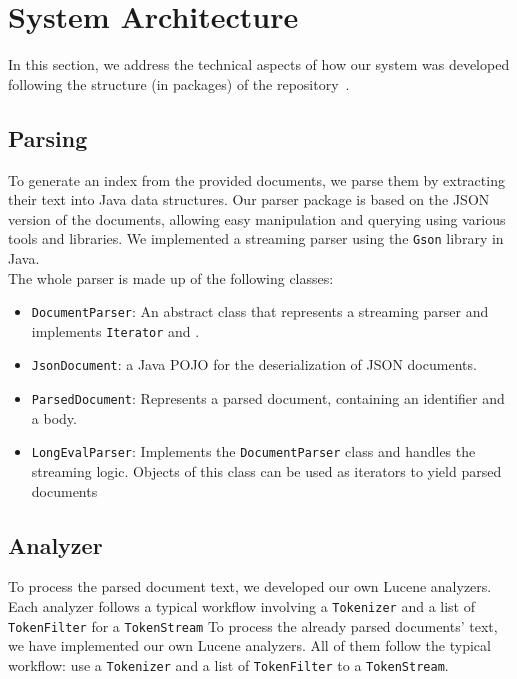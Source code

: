 \section{System Architecture}\label{sec:architecture}

In this section, we address the technical aspects of how our system was developed following the structure (in packages)
of the repository~\cite{jihuming}.

\subsection{Parsing}\label{subsec:parsing}
To generate an index from the provided documents, we parse them by extracting their text into Java data structures.
Our parser package is based on the JSON version of the documents, allowing easy manipulation and querying using various tools 
and libraries. We implemented a streaming parser using the \texttt{Gson} library in Java.\\

The whole parser is made up of the following classes:
\begin{itemize}
    \item \texttt{DocumentParser}:  An abstract class that represents a streaming parser and implements \texttt{Iterator} 
    and .
    \item \texttt{JsonDocument}: a Java POJO for the deserialization of JSON documents.
    \item \texttt{ParsedDocument}: Represents a parsed document, containing an identifier and a body.
    \item \texttt{LongEvalParser}: Implements the \texttt{DocumentParser} class and handles the streaming logic. 
    Objects of this class can be used as iterators to yield parsed documents
\end{itemize}

\subsection{Analyzer}\label{subsec:analyzer}
To process the parsed document text, we developed our own Lucene analyzers. Each analyzer follows a typical workflow 
involving a \texttt{Tokenizer} and a list of \texttt{TokenFilter} for a \texttt{TokenStream}
To process the already parsed documents' text, we have implemented our own Lucene analyzers.
All of them follow the typical workflow: use a \texttt{Tokenizer} and a list of \texttt{TokenFilter} to a
\texttt{TokenStream}.\\

